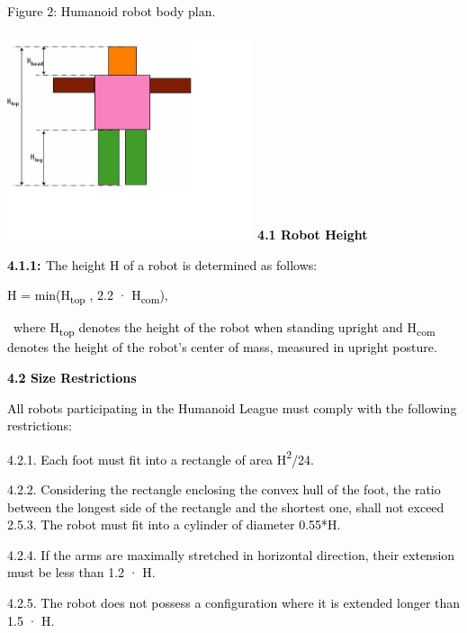 \documentclass[a4paper]{article}
\begin{document}
\textcolor{black}{Figure 2: Humanoid robot body plan.}

{\centering
\includegraphics[width=7.234cm,height=6.07cm]{img/HELSI_rules_2025-img002.jpg}}
\textbf{\textcolor{black}{4.1 Robot Height}}

\textbf{\textcolor{black}{4.1.1: }}\textcolor{black}{The height H of a robot is determined as follows:}

\textcolor{black}{H = min(H\textsubscript{top }, 2.2 · H}\textcolor{black}{\textsubscript{com}}\textcolor{black}{),}

\textcolor{black}{\ where H}\textcolor{black}{\textsubscript{top }}\textcolor{black}{denotes the height of the robot
when standing upright and H}\textcolor{black}{\textsubscript{com }}\textcolor{black}{denotes the height of the robot's
center of mass, measured in upright posture.}


\bigskip

\textbf{\textcolor{black}{4.2 Size Restrictions}}

\textcolor{black}{All robots participating in the Humanoid League must comply with the following restrictions:}

\textcolor{black}{4.2.1. Each foot must fit into a rectangle of area
H}\textcolor{black}{\textsuperscript{2}}\textcolor{black}{/24.}

\textcolor{black}{4.2.2. Considering the rectangle enclosing the convex hull of the foot, the ratio between the longest
side of the rectangle and the shortest one, shall not exceed 2.5.3. The robot must fit into a cylinder of diameter 0.55*H.}

\textcolor{black}{4.2.4. If the arms are maximally stretched in horizontal direction, their extension must be less than
1.2 · H.}

\textcolor{black}{4.2.5. The robot does not possess a configuration where it is extended longer than 1.5 · H.}
\end{document}
